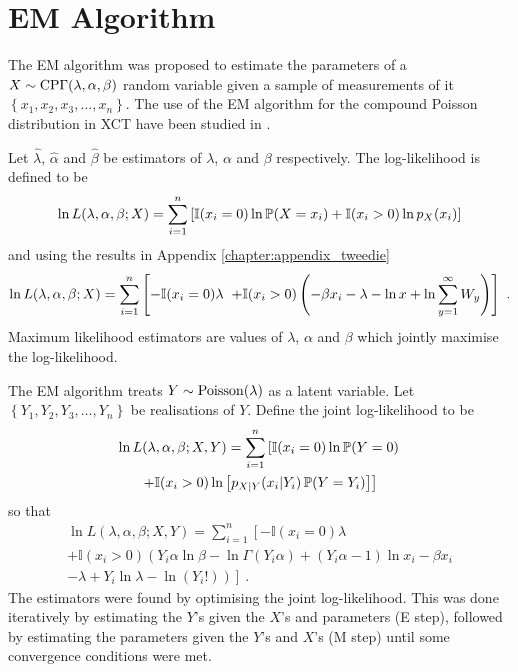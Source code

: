 \section{EM Algorithm}

The EM algorithm \citep{dempster1977maximum} was proposed to estimate the parameters of a $X\sim\operatorname{CP\Gamma}(\lambda,\alpha,\beta)$ random variable given a sample of measurements of it $\left\{x_1,x_2,x_3,\dotsc,x_n\right\}$. The use of the EM algorithm for the compound Poisson distribution in XCT have been studied in \cite{elbakri2003statistical, xie2008x, xu2009electronic}.

Let $\widehat{\lambda}$, $\widehat{\alpha}$ and $\widehat{\beta}$ be estimators of $\lambda$, $\alpha$ and $\beta$ respectively. The log-likelihood is defined to be
\begin{equation*}
  \ln L(\lambda,\alpha,\beta;X) = \sum_{i=1}^n
  \left[
    \mathbb{I}(x_i=0)\ln \operatorname{\mathbb{P}}(X=x_i)
    +\mathbb{I}(x_i>0)\ln p_X(x_i)
  \right]
\end{equation*}
and using the results in Appendix \ref{chapter:appendix_tweedie}
\begin{equation}
  \ln L(\lambda,\alpha,\beta;X) =
    \sum_{i=1}^n
    \left[
      -\mathbb{I}(x_i=0)\lambda
      \vphantom{\sum_i^i}
    \right.
    {}\\
    \left.
      +\mathbb{I}(x_i>0)\left(
      -\beta x_i-\lambda-\ln x +\ln\sum_{y=1}^\infty W_y
      \right)
    \right] \ .
\end{equation}
Maximum likelihood estimators are values of $\lambda$, $\alpha$ and $\beta$ which jointly maximise the log-likelihood.

The EM algorithm \citep{dempster1977maximum} treats $Y\sim\operatorname{Poisson}(\lambda)$ as a latent variable. Let $\left\{Y_1,Y_2,Y_3,\dotsc, Y_n\right\}$ be realisations of $Y$. Define the joint log-likelihood to be
\begin{multline*}
  \ln L(\lambda,\alpha,\beta;X,Y)
  =
  \sum_{i=1}^n
  \left[
    \mathbb{I}(x_i=0)
    \ln
    \operatorname{\mathbb{P}}(Y=0)
  \right.
  \\
  \left.
    +
    \mathbb{I}(x_i>0)
    \ln
    \left[
      p_{X|Y}(x_i|Y_i)\operatorname{\mathbb{P}}(Y=Y_i)
    \right]
  \right]
\end{multline*}
so that
\begin{multline}
  \ln L(\lambda,\alpha,\beta;X,Y)=
  \sum_{i=1}^n
  \left[
    -\mathbb{I}(x_i=0)
    \lambda
  \right.
  \\
  \left.+
    \mathbb{I}(x_i>0)
    \left(
      Y_i\alpha\ln\beta-\ln\Gamma(Y_i\alpha)+(Y_i\alpha-1)\ln x_i - \beta x_i
    \right.
  \right.
  \\
  \left.
    \left.  
      - \lambda + Y_i \ln \lambda - \ln(Y_i!)
    \right)
  \right]
  \ .
  \label{eq:compoundPoisson_jointLogLikelihood}
\end{multline}
The estimators were found by optimising the joint log-likelihood. This was done iteratively by estimating the $Y$'s given the $X$'s and parameters (E step), followed by estimating the parameters given the $Y$'s and $X$'s (M step) until some convergence conditions were met.


